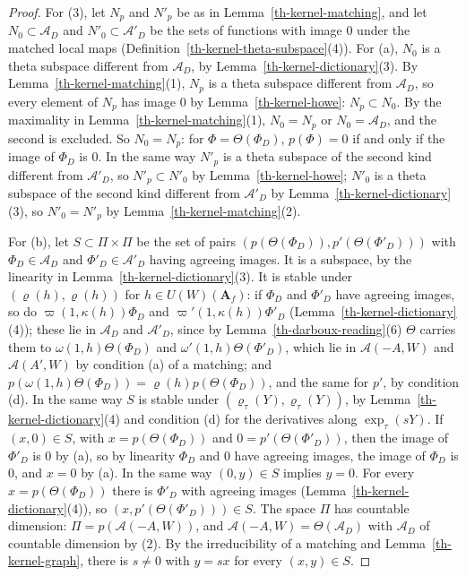\begin{proof}
For (3), let $N_p$ and $N'_p$ be as in Lemma~\ref{th-kernel-matching}, and
let $N_0\subset\mathcal A_D$ and $N'_0\subset\mathcal A'_D$ be the sets of
functions with image $0$ under the matched local maps
(Definition~\ref{th-kernel-theta-subspace}(4)). For (a), $N_0$ is a theta
subspace different from $\mathcal A_D$, by
Lemma~\ref{th-kernel-dictionary}(3). By Lemma~\ref{th-kernel-matching}(1),
$N_p$ is a theta subspace different from $\mathcal A_D$, so every element of
$N_p$ has image $0$ by Lemma~\ref{th-kernel-howe}: $N_p\subset N_0$. By the
maximality in Lemma~\ref{th-kernel-matching}(1), $N_0=N_p$ or
$N_0=\mathcal A_D$, and the second is excluded. So $N_0=N_p$: for
$\Phi=\Theta(\Phi_D)$, $p(\Phi)=0$ if and only if the image of $\Phi_D$ is
$0$. In the same way $N'_p$ is a theta subspace of the second kind different
from $\mathcal A'_D$, so $N'_p\subset N'_0$ by Lemma~\ref{th-kernel-howe};
$N'_0$ is a theta subspace of the second kind different from $\mathcal A'_D$
by Lemma~\ref{th-kernel-dictionary}(3), so $N'_0=N'_p$ by
Lemma~\ref{th-kernel-matching}(2).

For (b), let $S\subset\Pi\times\Pi$ be the set of pairs
$(p(\Theta(\Phi_D)),p'(\Theta(\Phi'_D)))$ with $\Phi_D\in\mathcal A_D$ and
$\Phi'_D\in\mathcal A'_D$ having agreeing images. It is a subspace, by the
linearity in Lemma~\ref{th-kernel-dictionary}(3). It is stable under
$(\varrho(h),\varrho(h))$ for $h\in U(W)(\mathbf A_f)$: if $\Phi_D$ and
$\Phi'_D$ have agreeing images, so do $\varpi(1,\kappa(h))\Phi_D$ and
$\varpi'(1,\kappa(h))\Phi'_D$ (Lemma~\ref{th-kernel-dictionary}(4)); these
lie in $\mathcal A_D$ and $\mathcal A'_D$, since by
Lemma~\ref{th-darboux-reading}(6) $\Theta$ carries them to
$\omega(1,h)\Theta(\Phi_D)$ and $\omega'(1,h)\Theta(\Phi'_D)$, which lie in
$\mathcal A(-A,W)$ and $\mathcal A(A',W)$ by condition (a) of a matching; and
$p(\omega(1,h)\Theta(\Phi_D))=\varrho(h)p(\Theta(\Phi_D))$, and the same for
$p'$, by condition (d). In the same way $S$ is stable under
$(\varrho_\tau(Y),\varrho_\tau(Y))$, by Lemma~\ref{th-kernel-dictionary}(4)
and condition (d) for the derivatives along $\exp_\tau(sY)$. If
$(x,0)\in S$, with $x=p(\Theta(\Phi_D))$ and $0=p'(\Theta(\Phi'_D))$, then
the image of $\Phi'_D$ is $0$ by (a), so by linearity $\Phi_D$ and $0$ have
agreeing images, the image of $\Phi_D$ is $0$, and $x=0$ by (a). In the same
way $(0,y)\in S$ implies $y=0$. For every $x=p(\Theta(\Phi_D))$ there is
$\Phi'_D$ with agreeing images (Lemma~\ref{th-kernel-dictionary}(4)), so
$(x,p'(\Theta(\Phi'_D)))\in S$. The space $\Pi$ has countable dimension:
$\Pi=p(\mathcal A(-A,W))$, and $\mathcal A(-A,W)=\Theta(\mathcal A_D)$ with
$\mathcal A_D$ of countable dimension by (2). By the irreducibility of a
matching and Lemma~\ref{th-kernel-graph}, there is $s\neq0$ with $y=sx$ for
every $(x,y)\in S$.


\end{proof}
